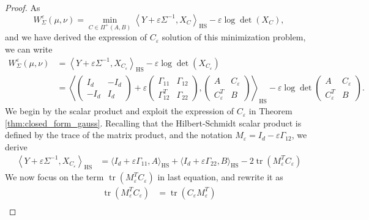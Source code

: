\documentclass[]{article}
\DeclareMathOperator{\tr}{tr}
\DeclareMathOperator{\HS}{HS}
\numberwithin{equation}{section}
\theoremstyle{plain}
\begin{document}
\begin{proof}
    As 
    \begin{equation*}
        W_{\Sigma}^{\varepsilon}(\mu, \nu) = \min_{C \in \Pi^{+}(A,B)} \left\langle Y + \varepsilon \Sigma^{-1}, X_C
         \right\rangle_{\HS} - \varepsilon \log \det (X_C), 
    \end{equation*}
    and we have derived the expression of $C_\varepsilon$ solution of this minimization problem, we can write 
    \begin{align*}
    W_{\Sigma}^{\varepsilon}(\mu, \nu)& =  \left\langle Y + \varepsilon \Sigma^{-1}, X_{C_\varepsilon}
         \right\rangle_{\HS} - \varepsilon \log \det (X_{C_\varepsilon}) \\
         & = \left\langle \begin{pmatrix}
        I_d & -I_d \\
        -I_d & I_d
        \end{pmatrix} + \varepsilon  \begin{pmatrix}
        \Gamma_{11} & \Gamma_{12} \\
        \Gamma_{12}^T& \Gamma_{22}
        \end{pmatrix}, \begin{pmatrix}
        A & C_\varepsilon \\
        C_\varepsilon^T& B
        \end{pmatrix}  \right\rangle_{\HS}  - \varepsilon \log \det \begin{pmatrix}
        A & C_\varepsilon \\
        C_\varepsilon^T& B
        \end{pmatrix} .
    \end{align*}
We begin by the scalar product and exploit the expression of $C_\varepsilon$ in Theorem \ref{thm:closed_form_gauss}. Recalling that the Hilbert-Schmidt scalar product is defined by the trace of the matrix product, and the notation $M_{\varepsilon}=I_d-\varepsilon \Gamma_{12}$, we derive 
\begin{align*}
    \left\langle Y + \varepsilon \Sigma^{-1}, X_{C_\varepsilon}
         \right\rangle_{\HS} & = \langle I_d + \varepsilon \Gamma_{11},A\rangle_{\HS} + \langle I_d + \varepsilon \Gamma_{22},B \rangle_{\HS} -2\tr(M_{\varepsilon}^TC_\varepsilon)
\end{align*}
We now focus on the term $\tr(M_{\varepsilon}^TC_\varepsilon)$ in last equation, and rewrite it as
\begin{align*}
    \tr( M_{\varepsilon}^T C_\varepsilon) & = \tr(C_\varepsilon M_{\varepsilon}^T) \\

\end{align*}
\end{proof}
\end{document}
